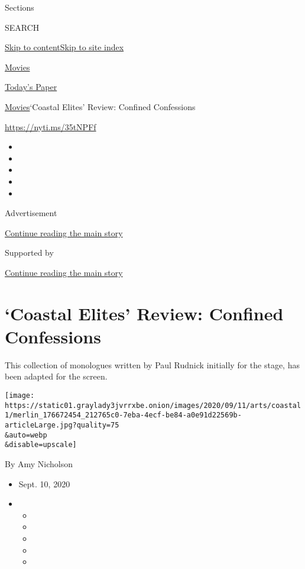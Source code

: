 Sections

SEARCH

\protect\hyperlink{site-content}{Skip to
content}\protect\hyperlink{site-index}{Skip to site index}

\href{https://www.nytimes3xbfgragh.onion/section/movies}{Movies}

\href{https://myaccount.nytimes3xbfgragh.onion/auth/login?response_type=cookie\&client_id=vi}{}

\href{https://www.nytimes3xbfgragh.onion/section/todayspaper}{Today's
Paper}

\href{/section/movies}{Movies}\textbar{}`Coastal Elites' Review:
Confined Confessions

\url{https://nyti.ms/35tNPFf}

\begin{itemize}
\item
\item
\item
\item
\item
\end{itemize}

Advertisement

\protect\hyperlink{after-top}{Continue reading the main story}

Supported by

\protect\hyperlink{after-sponsor}{Continue reading the main story}

\hypertarget{coastal-elites-review-confined-confessions}{%
\section{`Coastal Elites' Review: Confined
Confessions}\label{coastal-elites-review-confined-confessions}}

This collection of monologues written by Paul Rudnick initially for the
stage, has been adapted for the screen.

\texttt{[image: https://static01.graylady3jvrrxbe.onion/images/2020/09/11/arts/coastal1/merlin\_176672454\_212765c0-7eba-4ecf-be84-a0e91d22569b-articleLarge.jpg?quality=75\\\&auto=webp\\\&disable=upscale]}

By Amy Nicholson

\begin{itemize}
\item
  Sept. 10, 2020
\item
  \begin{itemize}
  \item
  \item
  \item
  \item
  \item
  \end{itemize}
\end{itemize}

